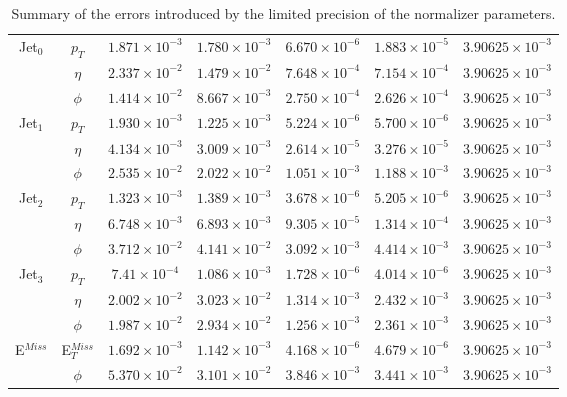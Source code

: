 \documentclass[../../main.tex]{subfiles}
\begin{document}
\begin{center}
\begin{table}[h]
\begin{tabular}{|c|c|c|c|c|c|c|}
        \hline
        \multirow{3}{*}{Jet$_0$} & $p_T$ &$1.871\times 10^{-3}$&$1.780\times 10^{-3}$&$6.670\times 10^{-6}$&$1.883\times 10^{-5}$&$3.90625\times 10^{-3}$ \\
        & $\eta$ &$2.337\times 10^{-2}$&$1.479\times 10^{-2}$&$7.648\times 10^{-4}$&$7.154\times 10^{-4}$&$3.90625\times 10^{-3}$ \\
        & $\phi$ &$1.414\times 10^{-2}$&$8.667\times 10^{-3}$&$2.750\times 10^{-4}$&$2.626\times 10^{-4}$&$3.90625\times 10^{-3}$ \\
        \hline
        \multirow{3}{*}{Jet$_1$} & $p_T$ &$1.930\times 10^{-3}$&$1.225\times 10^{-3}$&$5.224\times 10^{-6}$&$5.700\times 10^{-6}$&$3.90625\times 10^{-3}$ \\
        & $\eta$ &$4.134\times 10^{-3}$&$3.009\times 10^{-3}$&$2.614\times 10^{-5}$&$3.276\times 10^{-5}$&$3.90625\times 10^{-3}$ \\
        & $\phi$ &$2.535\times 10^{-2}$&$2.022\times 10^{-2}$&$1.051\times 10^{-3}$&$1.188\times 10^{-3}$&$3.90625\times 10^{-3}$ \\
        \hline
        \multirow{3}{*}{Jet$_2$} & $p_T$ &$1.323\times 10^{-3}$&$1.389\times 10^{-3}$&$3.678\times 10^{-6}$&$5.205\times 10^{-6}$&$3.90625\times 10^{-3}$ \\
        & $\eta$ &$6.748\times 10^{-3}$&$6.893\times 10^{-3}$&$9.305\times 10^{-5}$&$1.314\times 10^{-4}$&$3.90625\times 10^{-3}$ \\
        & $\phi$ &$3.712\times 10^{-2}$&$4.141\times 10^{-2}$&$3.092\times 10^{-3}$&$4.414\times 10^{-3}$&$3.90625\times 10^{-3}$ \\
        \hline
        \multirow{3}{*}{Jet$_3$} & $p_T$ &$7.41\times 10^{-4}$&$1.086\times 10^{-3}$&$1.728\times 10^{-6}$&$4.014\times 10^{-6}$&$3.90625\times 10^{-3}$ \\
        & $\eta$ &$2.002\times 10^{-2}$&$3.023\times 10^{-2}$&$1.314\times 10^{-3}$&$2.432\times 10^{-3}$&$3.90625\times 10^{-3}$ \\
        & $\phi$ &$1.987\times 10^{-2}$&$2.934\times 10^{-2}$&$1.256\times 10^{-3}$&$2.361\times 10^{-3}$&$3.90625\times 10^{-3}$ \\
        \hline
        \multirow{2}{*}{E$^{Miss}$} & E$_T^{Miss}$&$1.692\times 10^{-3}$&$1.142\times 10^{-3}$&$4.168\times 10^{-6}$&$4.679\times 10^{-6}$&$3.90625\times 10^{-3}$ \\
        & $\phi$ &$5.370\times 10^{-2}$&$3.101\times 10^{-2}$&$3.846\times 10^{-3}$&$3.441\times 10^{-3}$&$3.90625\times 10^{-3}$ \\
        \hline
        
    \end{tabular}
    \caption{Summary of the errors introduced by the limited precision of the normalizer parameters.}
    \label{tab:Norm_errors}
    \end{table}
\end{center}
\end{document}
